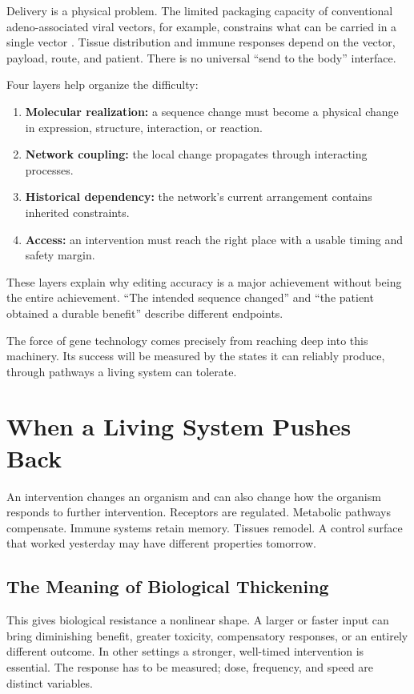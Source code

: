 \documentclass[11pt,openany]{book}
\begin{document}
Delivery is a physical problem. The limited packaging capacity of conventional adeno-associated viral vectors, for example, constrains what can be carried in a single vector \cite{naso2017adeno}. Tissue distribution and immune responses depend on the vector, payload, route, and patient. There is no universal “send to the body” interface.

Four layers help organize the difficulty:
\begin{enumerate}
 \item \textbf{Molecular realization:} a sequence change must become a physical change in expression, structure, interaction, or reaction.
 \item \textbf{Network coupling:} the local change propagates through interacting processes.
 \item \textbf{Historical dependency:} the network's current arrangement contains inherited constraints.
 \item \textbf{Access:} an intervention must reach the right place with a usable timing and safety margin.
\end{enumerate}

These layers explain why editing accuracy is a major achievement without being the entire achievement. “The intended sequence changed” and “the patient obtained a durable benefit” describe different endpoints.

The force of gene technology comes precisely from reaching deep into this machinery. Its success will be measured by the states it can reliably produce, through pathways a living system can tolerate.

\section{When a Living System Pushes Back}

An intervention changes an organism and can also change how the organism responds to further intervention. Receptors are regulated. Metabolic pathways compensate. Immune systems retain memory. Tissues remodel. A control surface that worked yesterday may have different properties tomorrow.

\subsection{The Meaning of Biological Thickening}

This gives biological resistance a nonlinear shape. A larger or faster input can bring diminishing benefit, greater toxicity, compensatory responses, or an entirely different outcome. In other settings a stronger, well-timed intervention is essential. The response has to be measured; dose, frequency, and speed are distinct variables.
\end{document}
